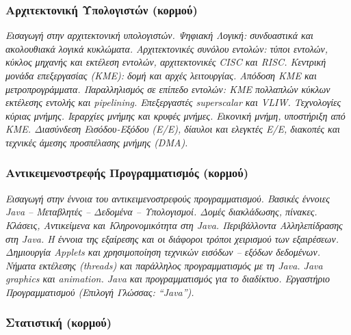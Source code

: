 \hypertarget{ux3b1ux3c1ux3c7ux3b9ux3c4ux3b5ux3baux3c4ux3bfux3bdux3b9ux3baux3ae-ux3c5ux3c0ux3bfux3bbux3bfux3b3ux3b9ux3c3ux3c4ux3ceux3bd-ux3baux3bfux3c1ux3bcux3bfux3cd}{%
\subsubsection{Αρχιτεκτονική Υπολογιστών
(κορμού)}\label{ux3b1ux3c1ux3c7ux3b9ux3c4ux3b5ux3baux3c4ux3bfux3bdux3b9ux3baux3ae-ux3c5ux3c0ux3bfux3bbux3bfux3b3ux3b9ux3c3ux3c4ux3ceux3bd-ux3baux3bfux3c1ux3bcux3bfux3cd}}

\emph{Εισαγωγή στην αρχιτεκτονική υπολογιστών. Ψηφιακή Λογική:
συνδυαστικά και ακολουθιακά λογικά κυκλώματα. Αρχιτεκτονικές συνόλου
εντολών: τύποι εντολών, κύκλος μηχανής και εκτέλεση εντολών,
αρχιτεκτονικές CISC και RISC. Κεντρική μονάδα επεξεργασίας (ΚΜΕ): δομή
και αρχές λειτουργίας. Απόδοση ΚΜΕ και μετροπρογράμματα. Παραλληλισμός
σε επίπεδο εντολών: ΚΜΕ πολλαπλών κύκλων εκτέλεσης εντολής και
pipelining. Επεξεργαστές superscalar και VLIW. Τεχνολογίες κύριας
μνήμης. Ιεραρχίες μνήμης και κρυφές μνήμες. Εικονική μνήμη, υποστήριξη
από ΚΜΕ. Διασύνδεση Εισόδου-Εξόδου (Ε/Ε), δίαυλοι και ελεγκτές Ε/Ε,
διακοπές και τεχνικές άμεσης προσπέλασης μνήμης (DMA).}

\hypertarget{ux3b1ux3bdux3c4ux3b9ux3baux3b5ux3b9ux3bcux3b5ux3bdux3bfux3c3ux3c4ux3c1ux3b5ux3c6ux3aeux3c2-ux3c0ux3c1ux3bfux3b3ux3c1ux3b1ux3bcux3bcux3b1ux3c4ux3b9ux3c3ux3bcux3ccux3c2-ux3baux3bfux3c1ux3bcux3bfux3cd}{%
\subsubsection{Αντικειμενοστρεφής Προγραμματισμός
(κορμού)}\label{ux3b1ux3bdux3c4ux3b9ux3baux3b5ux3b9ux3bcux3b5ux3bdux3bfux3c3ux3c4ux3c1ux3b5ux3c6ux3aeux3c2-ux3c0ux3c1ux3bfux3b3ux3c1ux3b1ux3bcux3bcux3b1ux3c4ux3b9ux3c3ux3bcux3ccux3c2-ux3baux3bfux3c1ux3bcux3bfux3cd}}

\emph{Εισαγωγή στην έννοια του αντικειμενοστρεφούς προγραμματισμού.
Βασικές έννοιες Java -- Μεταβλητές -- Δεδομένα -- Υπολογισμοί. Δομές
διακλάδωσης, πίνακες. Κλάσεις, Αντικείμενα και Κληρονομικότητα στη Java.
Περιβάλλοντα Αλληλεπίδρασης στη Java. Η έννοια της εξαίρεσης και οι
διάφοροι τρόποι χειρισμού των εξαιρέσεων. Δημιουργία Applets και
χρησιμοποίηση τεχνικών εισόδων -- εξόδων δεδομένων. Νήματα εκτέλεσης
(threads) και παράλληλος προγραμματισμός με τη Java. Java graphics και
animation. Java και προγραμματισμός για το διαδίκτυο. Εργαστήριο
Προγραμματισμού (Επιλογή Γλώσσας: ``Java'').}

\hypertarget{ux3c3ux3c4ux3b1ux3c4ux3b9ux3c3ux3c4ux3b9ux3baux3ae-ux3baux3bfux3c1ux3bcux3bfux3cd}{%
\subsubsection{Στατιστική
(κορμού)}\label{ux3c3ux3c4ux3b1ux3c4ux3b9ux3c3ux3c4ux3b9ux3baux3ae-ux3baux3bfux3c1ux3bcux3bfux3cd}}

